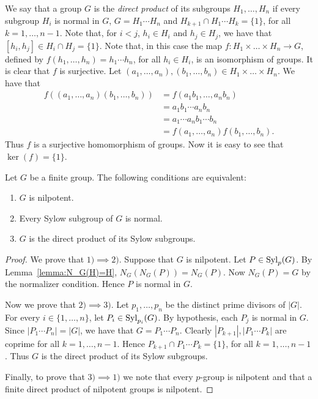 We say that a group $G$ is the {\em direct product} of its subgroups $H_1,\dots ,H_n$ if every subgroup $H_i$ is normal in $G$, $G=H_1\cdots H_n$ and
$H_{k+1}\cap H_1\cdots H_{k}=\{ 1\}$, for all $k=1,\dots, n-1$. Note that, for $i<j$, $h_i\in H_i$ and $h_j\in H_j$, we have that $[h_i,h_j]\in H_i\cap H_j=\{ 1\}$. Note that, in this case the map $f\colon H_1\times\dots\times H_n\rightarrow G$, defined by $f(h_1,\dots ,h_n)=h_1\cdots h_n$, for all $h_i\in H_i$, is an isomorphism of groups. It is clear that $f$ is surjective. Let $(a_1,\dots,a_n),(b_1,\dots,b_n)\in H_1\times\dots\times H_n$. We have that
\begin{align*}
f((a_1,\dots,a_n)(b_1,\dots,b_n))&=f(a_1b_1,\dots,a_nb_n)\\
&=a_1b_1\cdots a_nb_n\\
&=a_1\cdots a_nb_1\cdots b_n\\
&=f(a_1,\dots ,a_n)f(b_1,\dots ,b_n).
\end{align*}
Thus $f$ is a surjective homomorphism of groups. Now it is easy to see that $\ker(f)=\{ 1\}$. 


\begin{theorem}
	\label{thm:nilpotente:eq}
	Let $G$ be a finite group. The following conditions are equivalent: 
	\begin{enumerate}
		\item $G$ is nilpotent.
		\item Every Sylow subgroup of $G$ is normal.
		\item $G$ is the direct product of its Sylow subgroups. 
	\end{enumerate}
\end{theorem}

\begin{proof}
	We prove that $1)\implies 2)$. Suppose that $G$ is nilpotent. Let $P\in\mathrm{Syl}_p(G)$.  By Lemma~\ref{lemma:N_G(H)=H},  
	$N_G(N_G(P))=N_G(P)$. Now  $N_G(P)=G$ by the normalizer condition. Hence $P$ is normal in $G$.

	Now we prove that $2)\implies 3)$. Let $p_1,\dots,p_n$ be the distinct prime divisors of $|G|$. For every $i\in\{1,\dots,n\}$, let $P_i\in\mathrm{Syl}_{p_i}(G)$.
	By hypothesis, each $P_j$ is normal in $G$. Since $|P_1\cdots P_n|=|G|$, we have that $G=P_1\cdots P_n$. Clearly
	$|P_{k+1}|, |P_1\cdots P_k|$ are coprime for all $k=1,\dots, n-1$. Hence $P_{k+1}\cap P_1\cdots P_k=\{ 1\}$, for all $k=1,\dots, n-1$. Thus $G$ is the direct product of its Sylow subgroups. 

	Finally, to prove that $3)\implies 1)$ we note that every 
	$p$-group is nilpotent and that a finite direct product of nilpotent groups is nilpotent. 
\end{proof}


